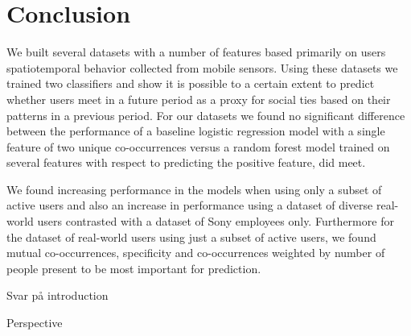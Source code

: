 \chapter{Conclusion}
\label{chap:conclusion}
 We built several datasets with a number of features based primarily on users spatiotemporal behavior collected from mobile sensors. Using these datasets we trained two classifiers and show it is possible to a certain extent to predict whether users meet in a future period as a proxy for social ties based on their patterns in a previous period. For our datasets we found no significant difference between the performance of a baseline logistic regression model with a single feature of two unique co-occurrences versus a random forest model trained on several features with respect to predicting the positive feature, did meet.

 We found increasing performance in the models when using only a subset of active users and also an increase in performance using a dataset of diverse real-world users contrasted with a dataset of Sony employees only. Furthermore for the dataset of real-world users using just a subset of active users, we found mutual co-occurrences, specificity and co-occurrences weighted by number of people present to be most important for prediction.

Svar på introduction
 
Perspective

